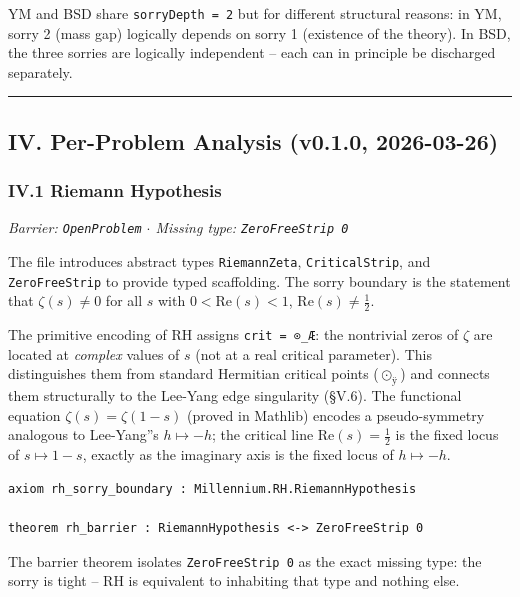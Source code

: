\documentclass[12pt,a4paper]{article}
\newcommand{\pilcrow}{\S}
\begin{document}
YM and BSD share \texttt{sorryDepth = 2} but for different structural reasons: in YM, sorry 2 (mass gap) logically depends on sorry 1 (existence of the theory). In BSD, the three sorries are logically independent  --  each can in principle be discharged separately.

\begin{center}
\rule{0.5\textwidth}{0.4pt}
\end{center}

\subsection{IV. Per-Problem Analysis (v0.1.0, 2026-03-26)}

\subsubsection{IV.1 Riemann Hypothesis}

\emph{Barrier: \texttt{OpenProblem} $\cdot$ Missing type: \texttt{ZeroFreeStrip 0}}

The file introduces abstract types \texttt{RiemannZeta}, \texttt{CriticalStrip}, and \texttt{ZeroFreeStrip} to provide typed scaffolding. The sorry boundary is the statement that $\zeta(s) \neq 0$ for all $s$ with $0 < \text{Re}(s) < 1$, $\text{Re}(s) \neq \frac{1}{2}$.

The primitive encoding of RH assigns \texttt{crit = ⊙\_Æ}: the nontrivial zeros of $\zeta$ are located at \emph{complex} values of $s$ (not at a real critical parameter). This distinguishes them from standard Hermitian critical points ($\odot_{\text{ÿ}}$) and connects them structurally to the Lee-Yang edge singularity (\pilcrow{}V.6). The functional equation $\zeta(s) = \zeta(1-s)$ (proved in Mathlib) encodes a pseudo-symmetry analogous to Lee-Yang''s $h \mapsto -h$; the critical line $\text{Re}(s) = \frac{1}{2}$ is the fixed locus of $s \mapsto 1-s$, exactly as the imaginary axis is the fixed locus of $h \mapsto -h$.

\begin{lstlisting}[language=lean]
axiom rh_sorry_boundary : Millennium.RH.RiemannHypothesis

theorem rh_barrier : RiemannHypothesis <-> ZeroFreeStrip 0
\end{lstlisting}

The barrier theorem isolates \texttt{ZeroFreeStrip 0} as the exact missing type: the sorry is tight  --  RH is equivalent to inhabiting that type and nothing else.
\end{document}
